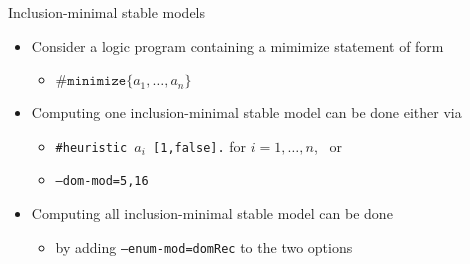 \begin{frame}{Inclusion-minimal stable models}
  \bigskip
  \begin{itemize}
  \item<1-> Consider a logic program containing a mimimize statement of form
    \begin{itemize}
    \item \( \#\mathtt{minimize}\{ a_1,\dots,a_n\} \)
    \end{itemize}
    \smallskip
  \item<2-> Computing one inclusion-minimal stable model can be done either via
    \begin{itemize}\normalsize
    \item \texttt{\#heuristic $a_i$ [1,false].} \qquad for $i=1,\dots,n$, \ or
    \item \texttt{--dom-mod=5,16}
    \end{itemize}
    \smallskip
  \item<3-> Computing all inclusion-minimal stable model can be done
    \begin{itemize}\normalsize
    \item by adding \texttt{--enum-mod=domRec} to the two options
    \end{itemize}
  \end{itemize}
\end{frame}